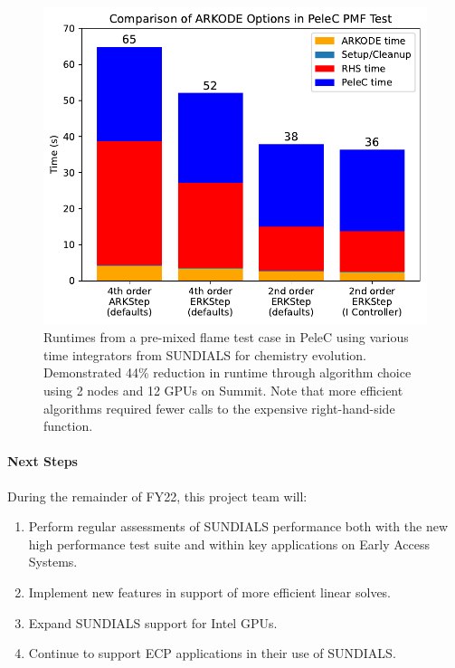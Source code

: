 \begin{figure}[htb]
  \centering
  \includegraphics[width=0.6\linewidth]{projects/2.3.3-MathLibs/2.3.3.12-SUNDIALS-hypre/PeleC_fig.pdf}
  \caption{\label{fig:sun-many-demo} Runtimes from a pre-mixed flame test case
  in PeleC using various time integrators from SUNDIALS for chemistry evolution.
  Demonstrated 44\% reduction in runtime through algorithm choice using 2 nodes
  and 12 GPUs on Summit. Note that more efficient algorithms required fewer
  calls to the expensive right-hand-side function.}
\end{figure}

\paragraph{Next Steps}

During the remainder of FY22, this project team will:
\begin{enumerate}
  \item Perform regular assessments of SUNDIALS performance both with the new
        high performance test suite and within key applications on Early Access
        Systems.
  \item Implement new features in support of more efficient linear solves.
  \item Expand SUNDIALS support for Intel GPUs.
  \item Continue to support ECP applications in their use of SUNDIALS.
\end{enumerate}
